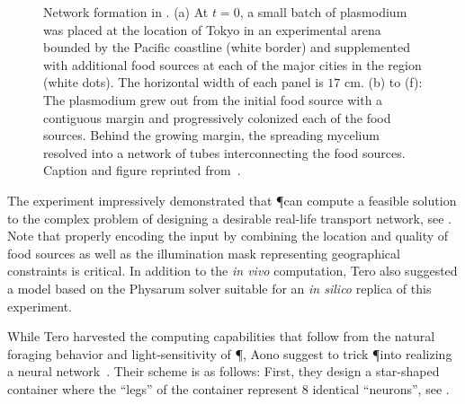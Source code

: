			\begin{figure}
				\centering
				\newline
				
				
				\caption[Tokyo railway experiment]{Network formation in \Pp. (a) At $t = 0$, a small batch of plasmodium was placed at the location of Tokyo in an experimental arena bounded by the Pacific coastline (white border) and supplemented with additional food sources at each of the major cities in the region (white dots). The horizontal width of each panel is $17$ cm. (b) to (f): The plasmodium grew out from the initial food source with a contiguous margin and progressively colonized each of the food sources. Behind the growing margin, the spreading mycelium resolved into a network of tubes interconnecting the food sources. Caption and figure reprinted from~\cite{Tero439}.}
				\label{fig:tokyo}
			\end{figure}

			The experiment impressively demonstrated that \P can compute a feasible solution to the complex problem of designing a desirable real-life transport network, see . Note that properly encoding the input by combining the location and quality of food sources as well as the illumination mask representing geographical constraints is critical. In addition to the \textit{in vivo} computation, Tero \etal also suggested a model based on the Physarum solver suitable for an \emph{in silico} replica of this experiment.

			\FloatBarrier

			While Tero \etal harvested the computing capabilities that follow from the natural foraging behavior and light-sensitivity of \P, Aono \etal suggest to trick \P into realizing a neural network~\cite{Aono:2007:ANC:1284621.1284651,Aono2009,Aono2007,Aono200883}. Their scheme is as follows: First, they design a star-shaped container where the ``legs'' of the container represent $8$ identical ``neurons'', see . 

